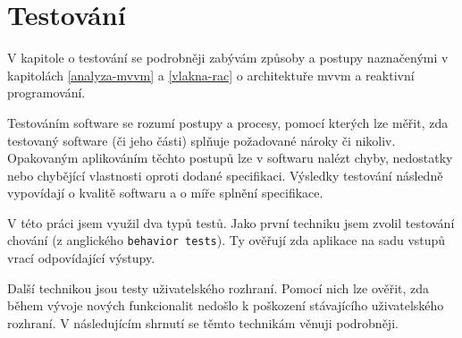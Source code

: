 \chapter{Testování}\label{testovani}



V kapitole o testování se podrobněji zabývám způsoby a postupy naznačenými v kapitolách \ref{analyza-mvvm} a \ref{vlakna-rac} o architektuře \acrshort{mvvm} a reaktivní programování.

Testováním software se rozumí postupy a procesy, pomocí kterých lze měřit, zda testovaný software (či jeho části) splňuje požadované nároky či nikoliv.
Opakovaným aplikováním těchto postupů lze v softwaru nalézt chyby, nedostatky nebo chybějící vlastnosti oproti dodané specifikaci.
Výsledky testování následně vypovídají o kvalitě softwaru a o míře splnění specifikace. \cite{software-testing-definition}

\bigskip

V této práci jsem využil dva typů testů.
Jako první techniku jsem zvolil testování chování (z anglického \texttt{behavior tests}).
Ty ověřují zda aplikace na sadu vstupů vrací odpovídající výstupy.

Další technikou jsou testy uživatelského rozhraní.
Pomocí nich lze ověřit, zda během vývoje nových funkcionalit nedošlo k poškození stávajícího uživatelského rozhraní.
V následujícím shrnutí se těmto technikám věnuji podrobněji.









